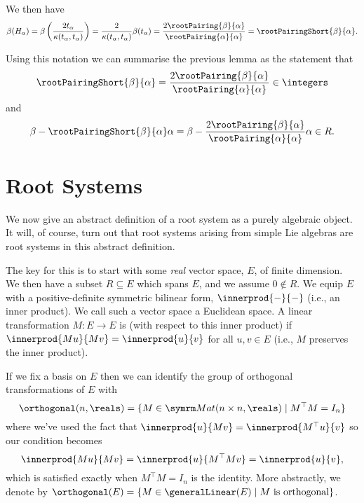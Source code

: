 \documentclass[fleqn]{NotesClass}
\newcommand{\trans}{{\top}}
\begin{document}
    We then have
    \begin{equation}
        \beta(H_\alpha) = \beta\left( \frac{2 t_\alpha}{\kappa(t_\alpha, t_\alpha)} \right) = \frac{2}{\kappa(t_\alpha, t_\alpha)} \beta(t_\alpha) = \frac{2 \rootPairing{\beta}{\alpha}}{\rootPairing{\alpha}{\alpha}} = \rootPairingShort{\beta}{\alpha}.
    \end{equation}
    
    Using this notation we can summarise the previous lemma as the statement that
    \begin{equation}
        \rootPairingShort{\beta}{\alpha} = \frac{2\rootPairing{\beta}{\alpha}}{\rootPairing{\alpha}{\alpha}} \in \integers
    \end{equation}
    and
    \begin{equation}
        \beta - \rootPairingShort{\beta}{\alpha}\alpha = \beta - \frac{2\rootPairing{\beta}{\alpha}}{\rootPairing{\alpha}{\alpha}}\alpha \in R.
    \end{equation}
    
    \section{Root Systems}
    We now give an abstract definition of a root system as a purely algebraic object.
    It will, of course, turn out that root systems arising from simple Lie algebras are root systems in this abstract definition.
    
    The key for this is to start with some \emph{real} vector space, \(E\), of finite dimension.
    We then have a subset \(R \subseteq E\) which spans \(E\), and we assume \(0 \notin R\).
    We equip \(E\) with a positive-definite symmetric bilinear form, \(\innerprod{-}{-}\) (i.e., an inner product).
    We call such a vector space a Euclidean space.
    A linear transformation \(M \colon E \to E\) is  (with respect to this inner product) if \(\innerprod{Mu}{Mv} = \innerprod{u}{v}\) for all \(u, v \in E\) (i.e., \(M\) preserves the inner product).
    
    If we fix a basis on \(E\) then we can identify the group of orthogonal transformations of \(E\) with
    \begin{equation}
        \orthogonal(n, \reals) = \{M \in \matrices[n]{n}{\reals} \mid M^{\trans} M = I_n\}
    \end{equation}
    where we've used the fact that \(\innerprod{u}{Mv} = \innerprod{M^{\trans}u}{v}\) so our condition becomes
    \begin{equation}
        \innerprod{Mu}{Mv} = \innerprod{u}{M^{\trans}Mv} = \innerprod{u}{v},
    \end{equation}
    which is satisfied exactly when \(M^{\trans}M = I_n\) is the identity.
    More abstractly, we denote by \(\orthogonal(E) = \{M \in \generalLinear(E) \mid M \text{ is orthogonal}\}\).
    
\end{document}
